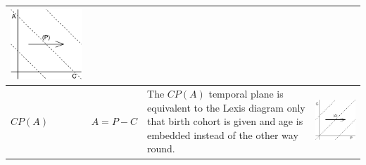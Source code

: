 \documentclass[
  12pt
]{scrartcl}
\begin{document}
\begin{center}
\begin{longtable}{m{}m{}m{}m{}}
  \includegraphics[width = \linewidth]{../fig/ACp.pdf} \\
  \midrule
  $CP(A)$ & $A = P - C$ &
  The $CP(A)$ temporal plane is equivalent to the Lexis diagram only that birth cohort is given and age is embedded instead of the other way round. &
  \includegraphics[width = \linewidth]{../fig/CPa.pdf} \\

\end{longtable}
\end{center}
\end{document}
